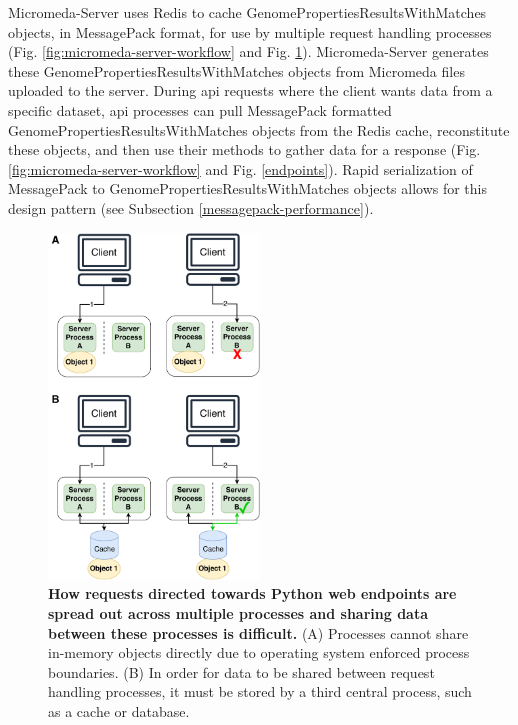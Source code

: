 Micromeda-Server uses Redis to cache GenomePropertiesResultsWithMatches objects, 
in MessagePack format, for use by multiple request handling processes (Fig. 
\ref{fig:micromeda-server-workflow} and Fig. \ref{fig:client-processing}). 
Micromeda-Server generates these GenomePropertiesResultsWithMatches objects from 
Micromeda files uploaded to the server. During \gls{api} requests where the 
client wants data from a specific dataset, \gls{api} processes can pull 
MessagePack formatted GenomePropertiesResultsWithMatches objects from the Redis 
cache, reconstitute these objects, and then use their methods to gather data for 
a response (Fig. \ref{fig:micromeda-server-workflow} and Fig. \ref{endpoints}). 
Rapid serialization of MessagePack to GenomePropertiesResultsWithMatches objects 
allows for this design pattern (see Subsection \ref{messagepack-performance}).

\begin{figure}[!ht]
  \centering
	\includegraphics[width=0.50\textwidth]{media/Client-Processing.pdf}
	 \caption[How requests directed towards Python web endpoints are spread out across 
multiple processes and sharing data between these processes is 
difficult.]{\textbf{How requests directed towards Python web endpoints are spread 
out across multiple processes and sharing data between these processes is 
difficult.} (A) Processes cannot share in-memory objects directly due to 
operating system enforced process boundaries. (B) In order for data to be shared 
between request handling processes, it must be stored by a third central 
process, such as a cache or database.}
	 \label{fig:client-processing}
\end{figure}

